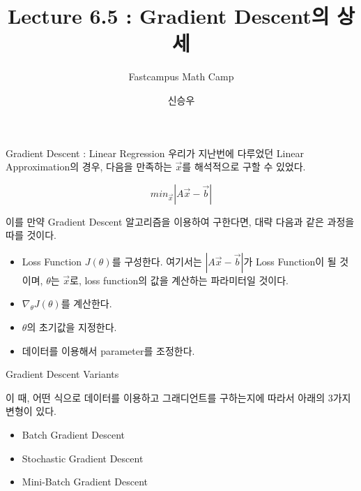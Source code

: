 \documentclass{beamer}
\title{Lecture 6.5 : Gradient Descent의 상세 }
\subtitle{Fastcampus Math Camp}
\author{신승우}
\begin{document}
\begin{frame}
 \titlepage
\end{frame}







\begin{frame}{Gradient Descent : Linear Regression}
우리가 지난번에 다루었던 Linear Approximation의 경우, 다음을 만족하는 $\vec{x}$를 해석적으로 구할 수 있었다. 

\begin{equation} 
min_{\vec{x}} |A\vec{x} - \vec{b}| 
\end{equation}

이를 만약 Gradient Descent 알고리즘을 이용하여 구한다면, 대략 다음과 같은 과정을 따를 것이다. 

\begin{itemize} 
\item Loss Function $J(\theta)$를 구성한다. 여기서는 $|A\vec{x} - \vec{b}|$가 Loss Function이 될 것이며, $\theta$는 $\vec{x}$로, loss function의 값을 계산하는 파라미터일 것이다. 
\item $\nabla_{\theta} J(\theta)$를 계산한다. 
\item $\theta$의 초기값을 지정한다. 
\item 데이터를 이용해서 parameter를 조정한다. 
\end{itemize}
\end{frame}

\begin{frame}{Gradient Descent Variants}

이 때, 어떤 식으로 데이터를 이용하고 그래디언트를 구하는지에 따라서 아래의 3가지 변형이 있다. 

\begin{itemize} 
\item Batch Gradient Descent
\item Stochastic Gradient Descent 
\item Mini-Batch Gradient Descent 
\end{itemize}
\end{frame}
\end{document}
